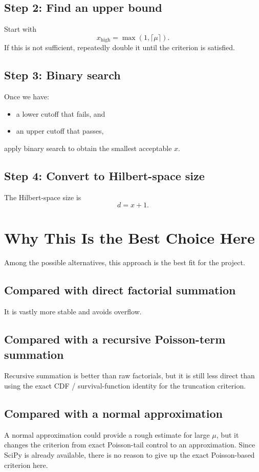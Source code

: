 \documentclass[12pt]{article}
\begin{document}
\subsection*{Step 2: Find an upper bound}
Start with
\[
x_{\text{high}} = \max(1,\lceil \mu \rceil).
\]
If this is not sufficient, repeatedly double it until the criterion is satisfied.

\subsection*{Step 3: Binary search}
Once we have:
\begin{itemize}
\item a lower cutoff that fails, and
\item an upper cutoff that passes,
\end{itemize}
apply binary search to obtain the smallest acceptable $x$.

\subsection*{Step 4: Convert to Hilbert-space size}
The Hilbert-space size is
\[
d = x+1.
\]

\section*{Why This Is the Best Choice Here}
Among the possible alternatives, this approach is the best fit for the project.

\subsection*{Compared with direct factorial summation}
It is vastly more stable and avoids overflow.

\subsection*{Compared with a recursive Poisson-term summation}
Recursive summation is better than raw factorials, but it is still less direct than using the exact CDF / survival-function identity for the truncation criterion.

\subsection*{Compared with a normal approximation}
A normal approximation could provide a rough estimate for large $\mu$, but it changes the criterion from exact Poisson-tail control to an approximation. Since SciPy is already available, there is no reason to give up the exact Poisson-based criterion here.
\end{document}
